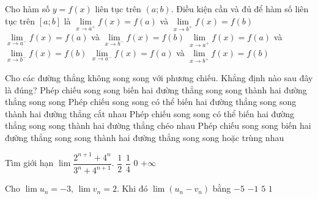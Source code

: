 \begin{ex}%
Cho hàm số $y=f\left(x\right)$ liên tục trên $(a;b)$. Điều kiện cần và đủ để hàm số liên tục trên $\left[a; b\right]$ là
\choice
{${\mathop{\lim}\limits_{x\to a^{+}}} f\left(x\right)=f\left(a\right)$ và ${\mathop{\lim}\limits_{x\to b^{+}}} f\left(x\right)=f\left(b\right)$}
{${\mathop{\lim}\limits_{x\to a^{-}}} f\left(x\right)=f\left(a\right)$ và ${\mathop{\lim}\limits_{x\to b^{-}}} f\left(x\right)=f\left(b\right)$}
{\True ${\mathop{\lim}\limits_{x\to a^{+}}} f\left(x\right)=f\left(a\right)$ và ${\mathop{\lim}\limits_{x\to b^{-}}} f\left(x\right)=f\left(b\right)$}
{${\mathop{\lim}\limits_{x\to a^{-}}} f\left(x\right)=f\left(a\right)$ và ${\mathop{\lim}\limits_{x\to b^{+}}} f\left(x\right)=f\left(b\right)$}
\end{ex}

\begin{ex}%
Cho các đường thẳng không song song với phương chiếu. Khẳng định nào sau đây là đúng?
\choice
{Phép chiếu song song biến hai đường thẳng song song thành hai đường thẳng song song}
{Phép chiếu song song có thể biến hai đường thẳng song song thành hai đường thẳng cắt nhau}
{Phép chiếu song song có thể biến hai đường thẳng song song thành hai đường thẳng chéo nhau}
{\True Phép chiếu song song biến hai đường thẳng song song thành hai đường thẳng song song hoặc trùng nhau}
\end{ex}

\begin{ex}%
Tìm giới hạn $\lim \dfrac{2^{n+1}+4^n}{3^n+4^{n+1}}$.
\choice
{$\dfrac{1}{2}$}
{\True $\dfrac{1}{4}$}
{$0$}
{$+\infty$}
\end{ex}

\begin{ex}%
Cho $\lim\limits u_n=-3$, $\lim\limits v_n=2$. Khi đó $\lim\limits \left(u_n-v_n\right)$ bằng
\choice
{\True $-5$}
{$-1$}
{$5$}
{$1$}
\end{ex}

